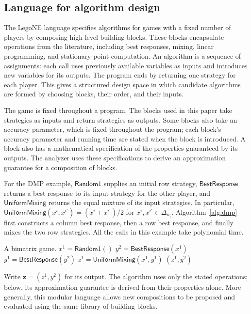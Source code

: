 \documentclass[11pt]{article}
\theoremstyle{remark}
\theoremstyle{plain}
\newcommand{\br}{\mathsf{BestResponse}}
\newcommand{\um}{\mathsf{UniformMixing}}
\begin{document}
\subsection{Language for algorithm design}
\label{sec:legone-blocks}

The LegoNE language specifies algorithms for games with a fixed number
of players by composing high-level building blocks. These blocks
encapsulate operations from the literature, including best responses,
mixing, linear programming, and stationary-point computation. An
algorithm is a sequence of assignments: each call uses previously
available variables as inputs and introduces new variables for its
outputs. The program ends by returning one strategy for each player.
This gives a structured design space in which candidate algorithms
are formed by choosing blocks, their order, and their inputs.

The game is fixed throughout a program. The blocks used in this
paper take strategies as inputs and return strategies as outputs.
Some blocks also take an accuracy parameter, which is fixed
throughout the program; each block's accuracy parameter and running
time are stated when the block is introduced. A block also has a
mathematical specification of the properties guaranteed by its
outputs. The analyzer uses these specifications to derive an
approximation guarantee for a composition of blocks.

For the DMP example, $\mathsf{Random1}$ supplies an initial row
strategy, $\br$ returns a best response to its input strategy
for the other player, and
$\um$ returns the equal mixture of its input strategies.
In particular,
$\um(x^i,x^{i\prime})=(x^i+x^{i\prime})/2$ for
$x^i,x^{i\prime}\in\Delta_{n_i}$.
Algorithm~\ref{alg:dmp} first constructs a column best response,
then a row best response, and finally mixes the two row strategies.
All the calls in this example take polynomial time.

\begin{algorithm}[htbp]
\caption{The DMP $1/2$-NE algorithm}
\label{alg:dmp}
\begin{algorithmic}[1]
 \Require A bimatrix game.
 \State $x^1=\mathsf{Random1}()$
 \State $y^2=\br(x^1)$
 \State $y^1=\br(y^2)$
 \State $z^1=\um(x^1,y^1)$
 \State \Return $(z^1,y^2)$
\end{algorithmic}
\end{algorithm}

Write $\boldsymbol z=(z^1,y^2)$ for its output. The algorithm uses
only the stated operations; below, its approximation guarantee is
derived from their properties alone. More generally, this modular language
allows new compositions to be proposed and evaluated using the same
library of building blocks.
\end{document}
